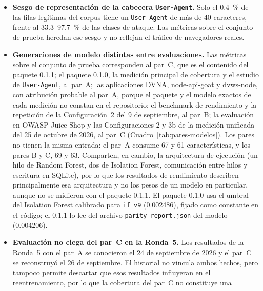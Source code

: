 \begin{itemize}
    comparte payloads con el entrenamiento (Procedimiento~4.2). Su tasa de bloqueo en ataques
    confirma que la librería instalada desde npm funciona en aplicaciones ajenas al proyecto, pero
    no mide la detección de payloads nuevos; esa medición corresponde al corpus limpio (M2). Sus
    tasas de bloqueo sobre tráfico legítimo no dependen de ese corpus y son la evidencia principal
    de generalización.
    \item \textbf{Sesgo de representación de la cabecera \texttt{User-Agent}.} Solo el 0.4~\%
    de las filas legítimas del corpus tiene un \texttt{User-Agent} de más de 40 caracteres,
    frente al 33.3--97.7~\% de las clases de ataque. Las métricas sobre el conjunto de prueba
    heredan ese sesgo y no reflejan el tráfico de navegadores reales.
    \item \textbf{Generaciones de modelo distintas entre evaluaciones.} Las métricas sobre el
    conjunto de prueba corresponden al par~C, que es el contenido del paquete 0.1.1; el paquete 0.1.0, la
    medición principal de cobertura y el estudio de \texttt{User-Agent}, al par~A; las aplicaciones DVNA, node-api-goat y
    dvws-node, con atribución probable al par~A, porque el paquete y el modelo exactos de cada
    medición no constan en el repositorio; el benchmark de rendimiento y la repetición de la
    Configuración~2 del 9 de septiembre, al par~B; la evaluación en OWASP Juice Shop y las Configuraciones 2 y 3b de la medición unificada del 25 de
    octubre de 2026, al par~C (Cuadro~\ref{tab:pares-modelos}). Los pares no tienen la misma entrada: el par~A consume 67 y 61
    características, y los pares B y C, 69 y 63. Comparten, en cambio, la arquitectura de ejecución
    (un hilo de Random Forest, dos de Isolation Forest, comunicación entre hilos y escritura en
    SQLite), por lo que los resultados de rendimiento describen principalmente esa arquitectura y no
    los pesos de un modelo en particular, aunque no se midieron con el paquete 0.1.1. El paquete 0.1.0
    usa el umbral del Isolation Forest calibrado para \texttt{if\_v9} (0.002486), fijado como
    constante en el código; el 0.1.1 lo lee del archivo \texttt{parity\_report.json} del modelo (0.004206).
    \item \textbf{Evaluación no ciega del par~C en la Ronda~5.} Los resultados de la Ronda~5 con el
    par~A se conocieron el 24 de septiembre de 2026 y el par~C se reconstruyó el 26 de septiembre.
    El historial no vincula ambos hechos, pero tampoco permite descartar que esos resultados
    influyeran en el reentrenamiento, por lo que la cobertura del par~C no constituye una

\end{itemize}
